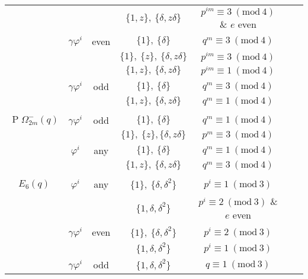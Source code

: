 \documentclass[11pt]{article}
\numberwithin{equation}{section}
\theoremstyle{shdefinition}
\theoremstyle{shplain}
\newcommand{\g}{\gamma}
\renewcommand{\d}{\delta}
\newcommand{\p}{\varphi}
\newcommand{\<}{\langle}
\renewcommand{\>}{\rangle}
\renewcommand{\:}{\colon}
\renewcommand{\mod}[1]{\mathrm{ \ } (\mathrm{mod\ } #1)}
\newcommand{\Om}{\Omega}
\newcommand{\POm}{\operatorname{P}\!\Om}
\begin{document}
\begin{table}
\begin{tabular}{ccccccc}
                 &          &            & $\{ 1, z \},\ \{ \d, z\d \}$        & $p^{im} \equiv 3 \mod{4}$ \& $e$ even \\[5.5pt] 
                 & $\g\p^i$ & even       & $\{ 1 \},\ \{ \d \}$                & $q^m \equiv 3 \mod{4}$                \\
                 &          &            & $\{ 1 \},\ \{ z \},\ \{ \d, z\d \}$ & $p^{im} \equiv 3 \mod{4}$             \\
                 &          &            & $\{ 1, z \},\ \{ \d, z\d \}$        & $p^{im} \equiv 1 \mod{4}$             \\[5.5pt] 
                 & $\g\p^i$ & odd        & $\{ 1 \},\ \{ \d \}$                & $q^m \equiv 3 \mod{4}$                \\
                 &          &            & $\{ 1, z \},\ \{ \d, z\d \}$        & $q^m \equiv 1 \mod{4}$                \\[5.5pt] 
\hline\\[-9pt]
$\POm^-_{2m}(q)$ & $\g\p^i$ & odd        & $\{ 1 \},\ \{ \d \}$                & $q^m \equiv 1 \mod{4}$                \\
                 &          &            & $\{ 1 \},\ \{ z \}, \{ \d, z\d \}$  & $p^m \equiv 3 \mod{4}$                \\[5.5pt] 
                 & $\p^i$   & any        & $\{ 1 \},\ \{ \d \}$                & $q^m \equiv 1 \mod{4}$                \\
                 &          &            & $\{ 1, z \},\ \{ \d, z\d \}$        & $q^m \equiv 3 \mod{4}$                \\[5.5pt] 
\hline\\[-9pt]
$E_6(q)$         & $\p^i$   & any        & $\{ 1 \},\ \{ \d, \d^2 \}$          & $p^i \equiv 1 \mod{3}$                \\
                 &          &            & $\{ 1, \d, \d^2 \}$                 & $p^i \equiv 2 \mod{3}$ \& $e$ even    \\[5.5pt] 
                 & $\g\p^i$ & even       & $\{ 1 \},\ \{ \d, \d^2 \}$          & $p^i \equiv 2 \mod{3}$                \\
                 &          &            & $\{ 1, \d, \d^2 \}$                 & $p^i \equiv 1 \mod{3}$                \\[5.5pt] 
                 & $\g\p^i$ & odd        & $\{ 1, \d, \d^2 \}$                 & $q \equiv 1 \mod{3}$                  \\[5.5pt] 

\end{tabular}
\end{table}
\end{document}
